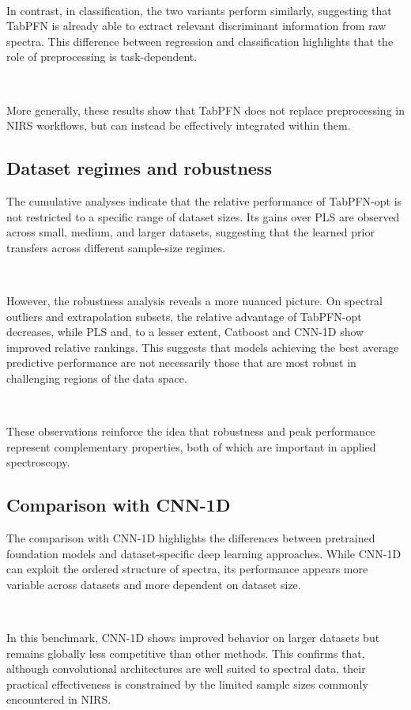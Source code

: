 \documentclass{article}
\begin{document}
~

In contrast, in classification, the two variants perform similarly, suggesting that TabPFN is already able to extract relevant discriminant information from raw spectra. This difference between regression and classification highlights that the role of preprocessing is task-dependent.

~

More generally, these results show that TabPFN does not replace preprocessing in NIRS workflows, but can instead be effectively integrated within them.

\subsection{Dataset regimes and robustness}

The cumulative analyses indicate that the relative performance of TabPFN-opt is not restricted to a specific range of dataset sizes. Its gains over PLS are observed across small, medium, and larger datasets, suggesting that the learned prior transfers across different sample-size regimes.

~

However, the robustness analysis reveals a more nuanced picture. On spectral outliers and extrapolation subsets, the relative advantage of TabPFN-opt decreases, while PLS and, to a lesser extent, Catboost and CNN-1D show improved relative rankings. This suggests that models achieving the best average predictive performance are not necessarily those that are most robust in challenging regions of the data space.

~

These observations reinforce the idea that robustness and peak performance represent complementary properties, both of which are important in applied spectroscopy.

\subsection{Comparison with CNN-1D}

The comparison with CNN-1D highlights the differences between pretrained foundation models and dataset-specific deep learning approaches. While CNN-1D can exploit the ordered structure of spectra, its performance appears more variable across datasets and more dependent on dataset size.

~

In this benchmark, CNN-1D shows improved behavior on larger datasets but remains globally less competitive than other methods. This confirms that, although convolutional architectures are well suited to spectral data, their practical effectiveness is constrained by the limited sample sizes commonly encountered in NIRS.
\end{document}
